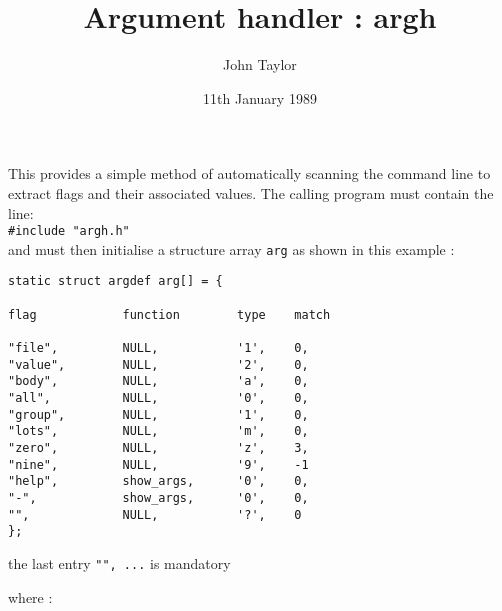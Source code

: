\title{Argument handler : argh}
\author{John Taylor}            %
\date{11th January 1989}        %
\maketitle                      %

This provides a simple method of automatically scanning the command line
to extract flags and their associated values.  The calling program must
contain the line:\\

\verb+#include "argh.h"+\\

and must then initialise a structure array
 \verb+arg+ as shown in this example :
\small
\begin{verbatim}
static struct argdef arg[] = {

flag            function        type    match

"file",         NULL,           '1',    0,
"value",        NULL,           '2',    0,
"body",         NULL,           'a',    0,
"all",          NULL,           '0',    0,
"group",        NULL,           '1',    0,
"lots",         NULL,           'm',    0,
"zero",         NULL,           'z',    3,
"nine",         NULL,           '9',    -1
"help",         show_args,      '0',    0,
"-",            show_args,      '0',    0,
"",             NULL,           '?',    0
};
\end{verbatim}
\normalsize
the last entry \verb+"", ...+ is mandatory

where :


